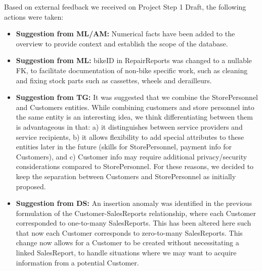 \documentclass{article}
\begin{document}
\vspace{1cm}
\begin{tcolorbox}[colback=secondarycolor, colframe=primarycolor, arc=5mm, title=\textbf{Step 1 --> Step 2}]
Based on external feedback we received on Project Step 1 Draft, the following actions were taken:
\vspace{0.2cm}
\begin{itemize}
  \item \textbf{Suggestion from ML/AM:} Numerical facts have been added to the overview to provide context and establish the scope of the database.
  \vspace{0.1cm}
  \item \textbf{Suggestion from ML:} bikeID in RepairReports was changed to a nullable FK, to facilitate documentation of non-bike specific work, such as cleaning and fixing stock parts such as cassettes, wheels and derailleurs.
  \vspace{0.1cm}
  \item \textbf{Suggestion from TG:} It was suggested that we combine the StorePersonnel and Customers entities. While combining customers and store personnel into the same entity is an interesting idea, we think differentiating between them is advantageous in that: a) it distinguishes between service providers and service recipients, b) it allows flexibility to add special attributes to these entities later in the future (skills for StorePersonnel, payment info for Customers), and c) Customer info may require additional privacy/security considerations compared to StorePersonnel. For these reasons, we decided to keep the separation between Customers and StorePersonnel as initially proposed.
  \vspace{0.1cm}
  \item \textbf{Suggestion from DS:} An insertion anomaly was identified in the previous formulation of the Customer-SalesReports relationship, where each Customer corresponded to one-to-many SalesReports. This has been altered here such that now each Customer corresponds to zero-to-many SalesReports. This change now allows for a Customer to be created without necessitating a linked SalesReport, to handle situations where we may want to acquire information from a potential Customer. 
\end{itemize}
\vspace{0.2cm}
\end{tcolorbox}

\vspace{1cm}
\end{document}
